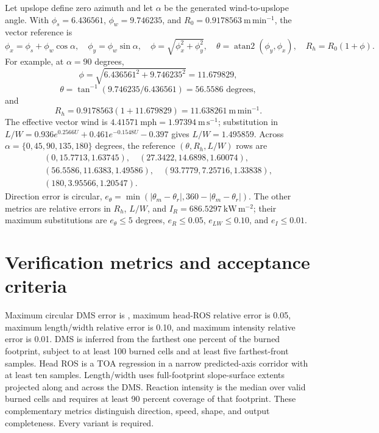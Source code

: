 Let upslope define zero azimuth and let \(\alpha\) be the generated
wind-to-upslope angle.  With \(\phi_s=6.436561\),
\(\phi_w=9.746235\), and \(R_0=0.9178563~\mathrm{m\,min^{-1}}\),
the vector reference is
\[
 \phi_x=\phi_s+\phi_w\cos\alpha,\quad
 \phi_y=\phi_w\sin\alpha,\quad
 \phi=\sqrt{\phi_x^2+\phi_y^2},\quad
 \theta=\operatorname{atan2}(\phi_y,\phi_x),\quad
 R_h=R_0(1+\phi).
\]
For example, at \(\alpha=90\) degrees,
\[\phi=\sqrt{6.436561^2+9.746235^2}=11.679829,\]
\[\theta=\tan^{-1}(9.746235/6.436561)=56.5586\text{ degrees},\]and
\[R_h=0.9178563(1+11.679829)=11.638261~\mathrm{m\,min^{-1}}.\]
The effective vector wind is \(4.41571~\mathrm{mph}=1.97394~\mathrm{m\,s^{-1}}\);
substitution in
\(L/W=0.936e^{0.2566U}+0.461e^{-0.1548U}-0.397\)
gives \(L/W=1.495859\).  Across
\(\alpha=\{0,45,90,135,180\}\) degrees, the reference
\((\theta,R_h,L/W)\) rows are
\[
\begin{gathered}
 (0,15.7713,1.63745),\quad (27.3422,14.6898,1.60074),\\
 (56.5586,11.6383,1.49586),\quad (93.7779,7.25716,1.33838),\\
 (180,3.95566,1.20547).
\end{gathered}
\]
Direction error is circular,
\(e_\theta=\min(|\theta_m-\theta_r|,360-|\theta_m-\theta_r|)\).
The other metrics are relative errors in \(R_h\), \(L/W\), and
\(I_R=686.5297~\mathrm{kW\,m^{-2}}\); their maximum substitutions are
\(e_\theta\leq5\) degrees, \(e_R\leq0.05\),
\(e_{LW}\leq0.10\), and \(e_I\leq0.01\).

\section{Verification metrics and acceptance criteria}
Maximum circular DMS error is \DirectionTolerance{}, maximum head-ROS relative error is 0.05, maximum length/width relative error is 0.10, and maximum intensity relative error is 0.01.  DMS is inferred from the farthest one percent of the burned footprint, subject to at least 100 burned cells and at least five farthest-front samples. Head ROS is a TOA regression in a narrow predicted-axis corridor with at least ten samples. Length/width uses full-footprint slope-surface extents projected along and across the DMS. Reaction intensity is the median over valid burned cells and requires at least 90 percent coverage of that footprint. These complementary metrics distinguish direction, speed, shape, and output completeness.  Every variant is required.

